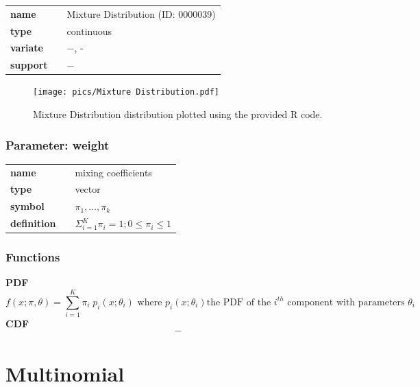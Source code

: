 \documentclass{article}
\begin{document}
  \bigskip 

\begin{tabular}{p{2cm}cl}
\textbf{name} & & Mixture Distribution (ID: 0000039)\\ 
 
\textbf{type} & & continuous \\ 

\textbf{variate} & & $-$, - \\ 

\textbf{support} & & $-$
\end{tabular}

\begin{figure}[ht!]
\centering
  \texttt{[image: pics/Mixture Distribution.pdf]}
 \caption{Mixture Distribution distribution plotted using the provided R code.}
 \label{fig:Mixture Distribution}
\end{figure}

\subsubsection*{Parameter: weight}

\noindent\begin{tabular}{p{2cm}cl}
\textbf{name} & & mixing coefficients \\
\textbf{type} & & vector \\
\textbf{symbol} & & $\pi_1, \ldots, \pi_k$  \\
\textbf{definition} & & $\Sigma_{i=1}^K \pi_i=1; 0\le \pi_i \le 1$
\end{tabular}
\subsubsection*{Functions}

\smallskip \noindent \hspace{.2cm} \textbf{PDF} 
\begin{equation*}f(x; \pi, \theta) = \sum_{i=1}^{K} \pi_{i}\; p_i(x; \theta_i) \text{ where } p_i(x; \theta_i) \text{the PDF of the } i^{th} \text{ component with parameters } \theta_i\end{equation*}
\smallskip \noindent \hspace{.2cm} \textbf{CDF} 
\begin{equation*}-\end{equation*}
\smallskip\section*{Multinomial} 
\end{document}

